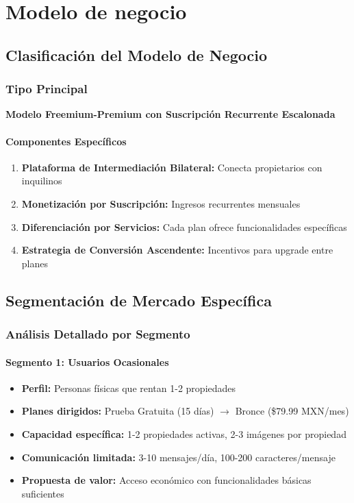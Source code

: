 \section{Modelo de negocio}
	\subsection{Clasificación del Modelo de Negocio}
		\subsubsection{Tipo Principal}
		\textbf{Modelo Freemium-Premium con Suscripción Recurrente Escalonada}
		
		\paragraph{Componentes Específicos}
		\begin{enumerate}
			\item \textbf{Plataforma de Intermediación Bilateral:} Conecta propietarios con inquilinos
			\item \textbf{Monetización por Suscripción:} Ingresos recurrentes mensuales
			\item \textbf{Diferenciación por Servicios:} Cada plan ofrece funcionalidades específicas
			\item \textbf{Estrategia de Conversión Ascendente:} Incentivos para upgrade entre planes
		\end{enumerate}
		
		\subsection{Segmentación de Mercado Específica}
		
		\subsubsection{Análisis Detallado por Segmento}
		
		\paragraph{Segmento 1: Usuarios Ocasionales}
		\begin{itemize}
			\item \textbf{Perfil:} Personas físicas que rentan 1-2 propiedades
			\item \textbf{Planes dirigidos:} Prueba Gratuita (15 días) $\rightarrow$ Bronce (\$79.99 MXN/mes)
			\item \textbf{Capacidad específica:} 1-2 propiedades activas, 2-3 imágenes por propiedad
			\item \textbf{Comunicación limitada:} 3-10 mensajes/día, 100-200 caracteres/mensaje
			\item \textbf{Propuesta de valor:} Acceso económico con funcionalidades básicas suficientes
		\end{itemize}
		

